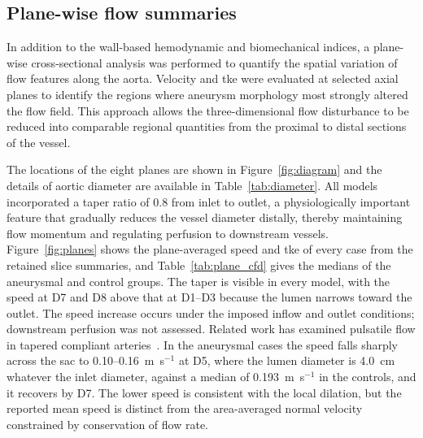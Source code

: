 \documentclass[12pt,a4paper]{article}
\newcommand{\cfdrevision}[1]{#1} %
\newcommand{\TKE}{\ac{tke}\xspace}
\theoremstyle{definition}
\numberwithin{equation}{section}
\providecommand{\DIFaddtex}[1]{{\protect\color{blue} \sf #1}} %
\providecommand{\DIFdeltex}[1]{{\protect\color{red} \scriptsize #1}} %
\providecommand{\DIFaddbegin}{} %
\providecommand{\DIFaddend}{} %
\providecommand{\DIFdelbegin}{} %
\providecommand{\DIFdelend}{} %
\providecommand{\DIFadd}[1]{\texorpdfstring{\DIFaddtex{#1}}{#1}} %
\providecommand{\DIFdel}[1]{\texorpdfstring{\DIFdeltex{#1}}{}} %
\newcommand{\DIFscaledelfig}{0.5}
\newlength{\DIFdelgraphicswidth} %
\newlength{\DIFdelgraphicsheight} %
\newcommand{\DIFaddincludegraphics}[2][]{{\color{blue}\fbox{\DIFOincludegraphics[#1]{#2}}}} %
\newcommand{\DIFdelincludegraphics}[2][]{%
\sbox{\DIFdelgraphicsbox}{\DIFOincludegraphics[#1]{#2}}%
\settoboxwidth{\DIFdelgraphicswidth}{\DIFdelgraphicsbox} %
\settoboxtotalheight{\DIFdelgraphicsheight}{\DIFdelgraphicsbox} %
\scalebox{\DIFscaledelfig}{%
\parbox[b]{\DIFdelgraphicswidth}{\usebox{\DIFdelgraphicsbox}\\[-\baselineskip] \rule{\DIFdelgraphicswidth}{0em}}\llap{\resizebox{\DIFdelgraphicswidth}{\DIFdelgraphicsheight}{%
\setlength{\unitlength}{\DIFdelgraphicswidth}%
\begin{picture}(1,1)%
\thicklines\linethickness{2pt} %
{\color[rgb]{1,0,0}\put(0,0){\framebox(1,1){}}}%
{\color[rgb]{1,0,0}\put(0,0){\line( 1,1){1}}}%
{\color[rgb]{1,0,0}\put(0,1){\line(1,-1){1}}}%
\end{picture}%
}\hspace*{3pt}}} %
} %
\DeclareRobustCommand{\DIFaddbegin}{\DIFOaddbegin \let\includegraphics\DIFaddincludegraphics} %
\DeclareRobustCommand{\DIFaddend}{\DIFOaddend \let\includegraphics\DIFOincludegraphics} %
\DeclareRobustCommand{\DIFdelbegin}{\DIFOdelbegin \let\includegraphics\DIFdelincludegraphics} %
\DeclareRobustCommand{\DIFdelend}{\DIFOaddend \let\includegraphics\DIFOincludegraphics} %
\renewcommand{\DIFaddtex}[1]{{\protect\color{red}#1}}
\renewcommand{\DIFdeltex}[1]{}
\renewcommand{\DIFdel}[1]{}
\renewcommand{\DIFaddincludegraphics}[2][]{\DIFOincludegraphics[#1]{#2}}
\renewcommand{\DIFdelincludegraphics}[2][]{}
\renewcommand{\cfdrevision}[1]{\textcolor{red}{#1}}
\def\DIFaddbegin{}\def\DIFaddend{}%
\def\DIFdelbegin{}\def\DIFdelend{}%
\def\cfdrevision#1{#1}%
\begin{document}



\DIFdelbegin %

\DIFdelend \subsection{Plane-wise flow summaries}
\label{sec:planes}

In addition to the wall-based hemodynamic and biomechanical indices, a plane-wise cross-sectional analysis was performed to quantify the spatial variation of flow features along the aorta. Velocity and \TKE were evaluated at selected axial planes to identify the regions where aneurysm morphology most strongly altered the flow field. This approach allows the three-dimensional flow disturbance to be reduced into comparable regional quantities from the proximal to distal sections of the vessel.

The locations of the eight planes are shown in Figure~\ref{fig:diagram} and the details of aortic diameter are available in Table~\ref{tab:diameter}. All models incorporated a taper ratio of 0.8 from inlet to outlet, a physiologically important feature that gradually reduces the vessel diameter distally, thereby maintaining flow momentum and regulating perfusion to downstream vessels. Figure~\ref{fig:planes} shows the plane-averaged speed and \TKE of every case from the retained slice summaries, and Table~\ref{tab:plane_cfd} gives the medians of the aneurysmal and control groups. The taper is visible in every model, with the speed at D7 and D8 above that at D1--D3 because the lumen narrows toward the outlet. \DIFdelbegin \DIFdel{This tapering-induced acceleration is essential for maintaining adequate perfusion pressure that ensures sufficient blood flow to downstream vascular beds. Indeed, studies have shown that flow velocity increases while vessel diameter decreases}\DIFdelend \DIFaddbegin \DIFadd{\cfdrevision{The speed increase occurs under the imposed inflow and outlet conditions; downstream perfusion was not assessed.} Related work has examined pulsatile flow in tapered compliant arteries}\DIFaddend ~\cite{kahveci2015numerical}. In the aneurysmal cases the speed falls sharply across the sac to 0.10--0.16~m~s$^{-1}$ at D5, where the lumen diameter is 4.0~cm whatever the inlet diameter, against a median of 0.193~m~s$^{-1}$ in the controls, and it recovers by D7. \DIFdelbegin \DIFdel{This is a direct consequence of the local dilation, where the increased cross-sectional area reduces flow velocity to conserve mass.
}\DIFdelend \DIFaddbegin \DIFadd{\cfdrevision{The lower speed is consistent with the local dilation, but the reported mean speed is distinct from the area-averaged normal velocity constrained by conservation of flow rate.}
}\DIFaddend 
\end{document}
